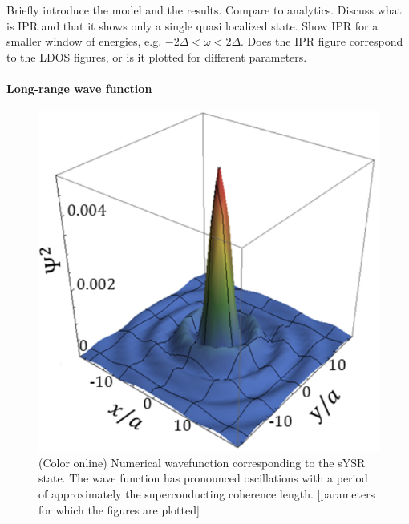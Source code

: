 \documentclass[twocolumn,showpacs,floatfix,nofootinbib,longbibliography]{revtex4-1}
\begin{document}
Briefly introduce the model and the results. Compare to analytics. Discuss what is IPR and that it shows only a single quasi localized state. Show IPR for a smaller window of energies, e.g. $-2\Delta<\omega<2\Delta$. Does the IPR figure correspond to the LDOS figures, or is it plotted for different parameters.  

\paragraph*{Long-range wave function} \label{sec:wavefuncion} 

\begin{figure} \centering
\includegraphics[width=0.7\linewidth]{WaveFunction}  
\caption{(Color online) Numerical wavefunction corresponding to the sYSR state. The wave function has pronounced oscillations with a period of approximately the superconducting coherence length. [parameters for which the figures are plotted]  } \label{fig:wavefunction}
\end{figure}
\end{document}
